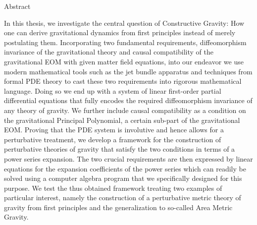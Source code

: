 \documentclass[a4paper,12pt, DIV=14, BCOR=5mm, twoside, headsepline, numbers=noenddot]{scrbook}
\newenvironment{abstract}{%
  \titlepage%
  \null\vfil%
  \begin{center}\normalfont\usekomafont{disposition}Abstract\end{center}%
}{%
  \par
  \vfil\null%
  \endtitlepage%
}
\begin{document}
\begin{abstract}
In this thesis, we investigate the central question of Constructive Gravity: 
How one can derive gravitational dynamics from first principles instead of merely postulating them. 
Incorporating two fundamental requirements, diffeomorphism invariance of the gravitational theory and causal compatibility of the gravitational EOM with given matter field equations, into our endeavor we use modern mathematical tools such as the jet bundle apparatus and techniques from formal PDE theory to cast these two requirements into rigorous mathematical language. Doing so we end up with a system of linear first-order partial differential equations that fully encodes the required diffeomorphism invariance of any theory of gravity. We further include causal compatibility as a condition on the gravitational Principal Polynomial, a certain sub-part of the gravitational EOM. 
Proving that the PDE system is involutive and hence allows for a perturbative treatment, we develop a framework for the construction of perturbative theories of gravity that satisfy the two conditions in terms of a power series expansion. The two crucial requirements are then expressed by linear equations for the expansion coefficients of the power series which can readily be solved using a computer algebra program that we specifically designed for this purpose. We test the thus obtained framework treating two examples of particular interest, namely the construction of a perturbative metric theory of gravity from first principles and the generalization to so-called Area Metric Gravity.
\end{abstract}
\end{document}
